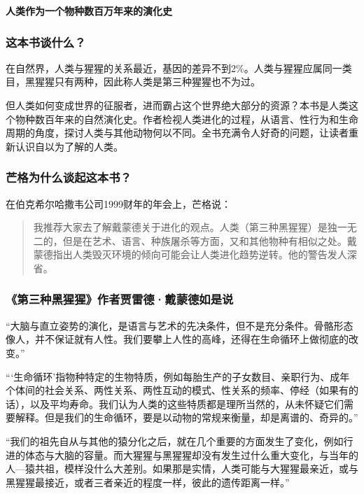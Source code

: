 \cleardoublepage
{}


\begin{BookSummaryBox}
\textbf{人类作为一个物种数百万年来的演化史}
\par
\end{BookSummaryBox}

\subsubsection*{这本书谈什么？}

在自然界，人类与猩猩的关系最近，基因的差异不到2\%。人类与猩猩应属同一类目，黑猩猩只有两种，因此称人类是第三种猩猩也不为过。
\par

但人类如何变成世界的征服者，进而霸占这个世界绝大部分的资源？本书是人类这个物种数百年来的自然演化史。作者检视人类进化的过程，从语言、性行为和生命周期的角度，探讨人类与其他动物何以不同。全书充满令人好奇的问题，让读者重新认识自以为了解的人类。
\par

\subsubsection*{芒格为什么谈起这本书？}

在伯克希尔哈撒韦公司1999财年的年会上，芒格说：
\par

\begin{quotation}
我推荐大家去了解戴蒙德关于进化的观点。人类（第三种黑猩猩）是独一无二的，但是在艺术、语言、种族屠杀等方面，又和其他物种有相似之处。戴蒙德指出人类毁灭环境的倾向可能会让人类进化趋势逆转。他的警告发人深省。
\par
\end{quotation}

\subsubsection*{《第三种黑猩猩》作者贾雷德·戴蒙德如是说}

“大脑与直立姿势的演化，是语言与艺术的先决条件，但不是充分条件。骨骼形态像人，并不保证就有人性。我们要攀上人性的高峰，还得在生命循环上做彻底的改变。”
\par

“‘生命循环’指物种特定的生物特质，例如每胎生产的子女数目、亲职行为、成年个体间的社会关系、两性关系、两性互动的模式、性关系的频率、停经（如果有的话），以及平均寿命。我们认为人类的这些特质都是理所当然的，从未怀疑它们需要解释。但是我们的生命循环，要是以动物的常规来衡量，却是离谱的、奇异的。”
\par

“我们的祖先自从与其他的猿分化之后，就在几个重要的方面发生了变化，例如行进的体态与大脑的容量。而大猩猩与黑猩猩却没有发生过什么重大变化，与当年的人—猿共祖，模样没什么大差别。如果那是实情，人类可能与大猩猩最亲近，或与黑猩猩最接近，或者三者亲近的程度一样，彼此的遗传距离一样。”
\par
